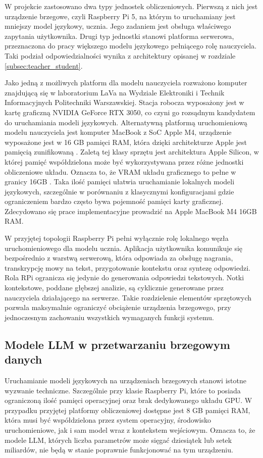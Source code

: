 W projekcie zastosowano dwa typy jednostek obliczeniowych. Pierwszą z nich jest urządzenie brzegowe, czyli Raspberry Pi 5, na którym to uruchamiany jest mniejszy model językowy, ucznia. Jego zadaniem jest obsługa właściwego zapytania użytkownika. Drugi typ jednostki stanowi platforma serwerowa, przeznaczona do pracy większego modelu językowego pełniącego rolę nauczyciela. Taki podział odpowiedzialności wynika z architektury opisanej w rozdziale \ref{subsec:teacher_student}.

Jako jedną z możliwych platform dla modelu nauczyciela rozważono komputer znajdującą się w laboratorium LaVa na Wydziale Elektroniki i Technik Informacyjnych Politechniki Warszawskiej. Stacja robocza wyposażony jest w kartę graficzną NVIDIA GeForce RTX 3050, co czyni go rozsądnym kandydatem do uruchamiania modeli językowych. Alternatywną platformą uruchomieniową modelu nauczyciela jest komputer MacBook z SoC Apple M4, urządzenie wyposażone jest w 16 GB pamięci RAM, która dzięki architekturze Apple jest pamięcią zunifikowaną \cite{AppleSiliconUMA}. Zaletą tej klasy sprzętu jest architektura Apple Silicon, w której pamięć współdzielona może być wykorzystywana przez różne jednostki obliczeniowe układu. Oznacza to, że VRAM układu graficznego to pełne w granicy 16GB \cite{AppleMetalCompute}. Taka ilość pamięci ułatwia uruchamianie lokalnych modeli językowych, szczególnie w porównaniu z klasycznymi konfiguracjami gdzie ograniczeniem bardzo często bywa pojemność pamięci karty graficznej. Zdecydowano się prace implementacyjne prowadzić na Apple MacBook M4 16GB RAM.

W przyjętej topologii Raspberry Pi pełni wyłącznie rolę lokalnego węzła uruchomieniowego dla modelu ucznia. Aplikacja użytkownika komunikuje się bezpośrednio z warstwą serwerową, która odpowiada za obsługę nagrania, transkrypcję mowy na tekst, przygotowanie kontekstu oraz syntezę odpowiedzi. Rola RPi ogranicza się jedynie do generowania odpowiedzi tekstowych. Notki kontekstowe, poddane głębszej analizie, są cyklicznie generowane przez nauczyciela działającego na serwerze. Takie rozdzielenie elementów sprzętowych pozwala maksymalnie ograniczyć obciążenie urządzenia brzegowego, przy jednoczesnym zachowaniu wszystkich wymaganych funkcji systemu.

\subsection{Modele LLM w przetwarzaniu brzegowym danych}

Uruchamianie modeli językowych na urządzeniach brzegowych stanowi istotne wyzwanie techniczne. Szczególnie przy klasie Raspberry Pi, które to posiada ograniczoną ilość pamięci operacyjnej oraz brak dedykowanego układu GPU. W przypadku przyjętej platformy obliczeniowej dostępne jest 8 GB pamięci RAM, która musi być współdzielona przez system operacyjny, środowisko uruchomieniowe, jak i sam model wraz z kontekstem wejściowym. Oznacza to, że modele LLM, których liczba parametrów może sięgać dziesiątek lub setek miliardów, nie będą w stanie poprawnie funkcjonować na tym urządzeniu.

